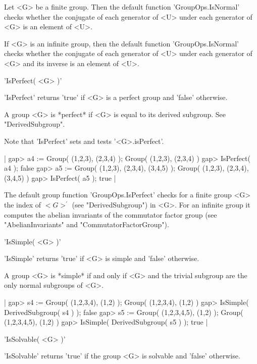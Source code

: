 Let <G> be a finite group.  Then the default function 'GroupOps.IsNormal'
checks  whether the  conjugate  of  each  generator  of  <U>  under  each
generator of <G> is an element of <U>.

If   <G>   is   an    infinite   group,   then   the   default   function
'GroupOps.IsNormal' checks whether the conjugate of each generator of <U>
under each generator of <G> and its inverse is an element of <U>.


'IsPerfect( <G> )'

'IsPerfect' returns  'true'  if  <G>    is  a perfect group  and  'false'
otherwise.

A  group <G> is *perfect* if  <G> is equal to  its derived subgroup.  See
"DerivedSubgroup".

Note that 'IsPerfect' sets and tests '<G>.isPerfect'.

|    gap> a4 := Group( (1,2,3), (2,3,4) );
    Group( (1,2,3), (2,3,4) )
    gap> IsPerfect( a4 );
    false
    gap> a5 := Group( (1,2,3), (2,3,4), (3,4,5) );
    Group( (1,2,3), (2,3,4), (3,4,5) )
    gap> IsPerfect( a5 );
    true |

The default group function 'GroupOps.IsPerfect' checks for a finite group
<G> the  index of $<G>^\prime$  (see  "DerivedSubgroup")  in <G>.  For an
infinite  group it  computes  the  abelian  invariants  of the commutator
factor group (see "AbelianInvariants" and "CommutatorFactorGroup").


'IsSimple( <G> )'

'IsSimple' returns 'true' if <G> is simple and 'false' otherwise.

A group <G> is *simple* if and only if <G>  and  the trivial subgroup are
the only normal subgroups of <G>.

|    gap> s4 := Group( (1,2,3,4), (1,2) );
    Group( (1,2,3,4), (1,2) )
    gap> IsSimple( DerivedSubgroup( s4 ) );
    false
    gap> s5 := Group( (1,2,3,4,5), (1,2) );
    Group( (1,2,3,4,5), (1,2) )
    gap> IsSimple( DerivedSubgroup( s5 ) );
    true |


'IsSolvable( <G> )'

'IsSolvable' returns 'true' if  the group  <G>   is solvable  and 'false'
otherwise.


